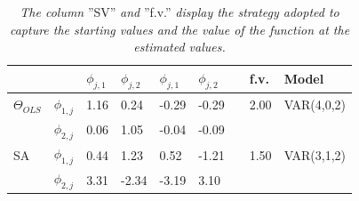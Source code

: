 \documentclass[<1p>]{elsarticle} %
\begin{document}
\begin{table}[H]
\begin{tabular}{lllllllll}
                                     &                & $\phi_{j,1}$    & $\phi_{j,2}$   & $\phi_{j,1}$                       & $\phi_{j,2}$ &&  f.v.& Model       \\ \hline
$\Theta_{OLS}$                     & $\phi_{1,j}$ & 1.16                & 0.24               & -0.29                                   & -0.29             &  & 2.00 & VAR(4,0,2)    \\
                                         & $\phi_{2,j}$ & 0.06                & 1.05               & -0.04                                   & -0.09             &  &    &       \\ \hline
SA                    & $\phi_{1,j}$ & 0.44                & 1.23               & 0.52                                   & -1.21             &     &1.50 &     VAR(3,1,2)  \\
                                         & $\phi_{2,j}$ & 3.31                & -2.34               & -3.19                                   & 3.10             &  &    &       \\ \hline
\end{tabular}%
\caption*{\textit{The column} ”SV” \textit{and} ”f.v.” \textit{display the strategy adopted to capture the starting values and the value of the function at the estimated values.}}
\end{table}
\end{document}
